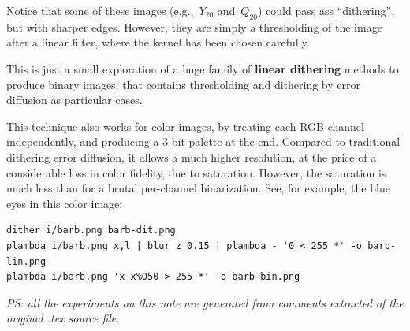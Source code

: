 Notice that some of these images (e.g.,~$Y_{20}$ and~$Q_{20}$) could pass ass
``dithering'', but with sharper edges.  However, they are simply a
thresholding of the image after a linear filter, where the kernel has been
chosen carefully.

This is just a small exploration of a huge family of {\bf linear dithering}
methods to produce binary images, that contains thresholding and dithering by
error diffusion as
particular cases.

This technique also works for color images, by treating each RGB channel
independently, and producing a 3-bit palette at the end.  Compared to
traditional dithering error diffusion, it allows a much higher resolution, at
the price of a considerable loss in color fidelity, due to saturation.
However, the saturation is much less than for a brutal per-channel
binarization.   See, for example, the
blue eyes in this color image:

\begin{verbatim}
dither i/barb.png barb-dit.png
plambda i/barb.png x,l | blur z 0.15 | plambda - '0 < 255 *' -o barb-lin.png
plambda i/barb.png 'x x%O50 > 255 *' -o barb-bin.png
\end{verbatim}
\begin{gallery}
\end{gallery}


\emph{
PS: all the experiments on this note are generated from comments extracted
of the original .tex source file.
}



